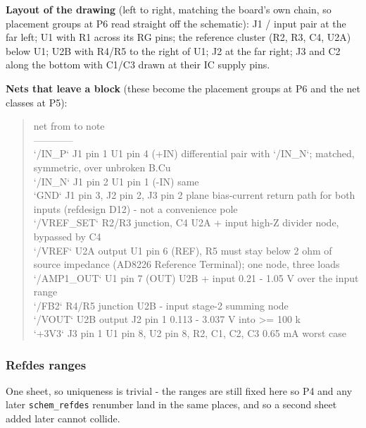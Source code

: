 \documentclass[11pt,a4paper]{article}
\begin{document}
\textbf{Layout of the drawing} (left to right, matching the board's own chain, so placement groups at P6 read straight off the schematic): J1 / input pair at the far left; U1 with R1 across its RG pins; the reference cluster (R2, R3, C4, U2A) below U1; U2B with R4/R5 to the right of U1; J2 at the far right; J3 and C2 along the bottom with C1/C3 drawn at their IC supply pins.

\textbf{Nets that leave a block} (these become the placement groups at P6 and the net classes at P5):

\begin{quote}\small\ttfamily\raggedright
\textbar{} net \textbar{} from \textbar{} to \textbar{} note \textbar{}\\
\textbar{}---\textbar{}---\textbar{}---\textbar{}---\textbar{}\\
\textbar{} `/IN\_P` \textbar{} J1 pin 1 \textbar{} U1 pin 4 (+IN) \textbar{} differential pair with `/IN\_N`; matched, symmetric, over unbroken B.Cu \textbar{}\\
\textbar{} `/IN\_N` \textbar{} J1 pin 2 \textbar{} U1 pin 1 (-IN) \textbar{} same \textbar{}\\
\textbar{} `GND` \textbar{} J1 pin 3, J2 pin 2, J3 pin 2 \textbar{} plane \textbar{} bias-current return path for both inputs (refdesign D12) - not a convenience pole \textbar{}\\
\textbar{} `/VREF\_SET` \textbar{} R2/R3 junction, C4 \textbar{} U2A + input \textbar{} high-Z divider node, bypassed by C4 \textbar{}\\
\textbar{} `/VREF` \textbar{} U2A output \textbar{} U1 pin 6 (REF), R5 \textbar{} must stay below 2 ohm of source impedance (AD8226 Reference Terminal); one node, three loads \textbar{}\\
\textbar{} `/AMP1\_OUT` \textbar{} U1 pin 7 (OUT) \textbar{} U2B + input \textbar{} 0.21 - 1.05 V over the input range \textbar{}\\
\textbar{} `/FB2` \textbar{} R4/R5 junction \textbar{} U2B - input \textbar{} stage-2 summing node \textbar{}\\
\textbar{} `/VOUT` \textbar{} U2B output \textbar{} J2 pin 1 \textbar{} 0.113 - 3.037 V into \textgreater{}= 100 k \textbar{}\\
\textbar{} `+3V3` \textbar{} J3 pin 1 \textbar{} U1 pin 8, U2 pin 8, R2, C1, C2, C3 \textbar{} 0.65 mA worst case \textbar{}
\end{quote}
\subsubsection*{Refdes ranges}
One sheet, so uniqueness is trivial - the ranges are still fixed here so P4 and any later \texttt{schem\_refdes} renumber land in the same places, and so a second sheet added later cannot collide.
\end{document}
